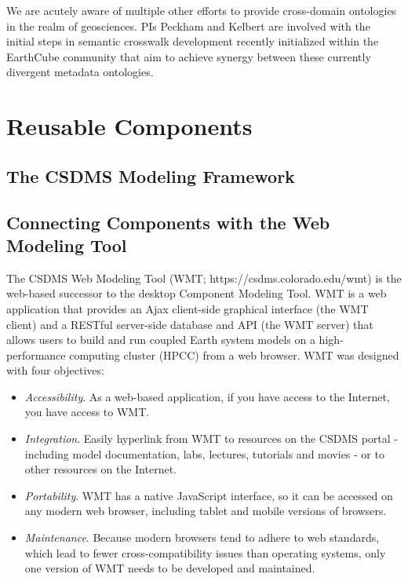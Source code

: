 \documentclass[11pt, oneside]{amsart}
\begin{document}
We are acutely aware of multiple other efforts to provide cross-domain
ontologies in the realm of geosciences. PIs Peckham and Kelbert are involved
with the initial steps in semantic crosswalk development recently initialized
within the EarthCube community that aim to achieve synergy between these
currently divergent metadata ontologies.


\section{Reusable Components}


\subsection{The CSDMS Modeling Framework}


\subsection{Connecting Components with the Web Modeling Tool}

The CSDMS Web Modeling Tool (WMT; https://csdms.colorado.edu/wmt) is the
web-based successor to the desktop Component Modeling Tool. WMT is a web
application that provides an Ajax client-side graphical interface (the WMT
client) and a RESTful server-side database and API (the WMT server) that allows
users to build and run coupled Earth system models on a high-performance
computing cluster (HPCC) from a web browser.
WMT was designed with four objectives:
\begin{itemize}

\item  \emph{Accessibility}. As a web-based application, if you have access
to the Internet, you have access to WMT.

\item  \emph{Integration}. Easily hyperlink from WMT to resources on the CSDMS
portal - including model documentation, labs, lectures, tutorials and
movies - or to other resources on the Internet.

\item \emph{Portability}. WMT has a native JavaScript interface, so it can be
accessed on any modern web browser, including tablet and mobile
versions of browsers.

\item \emph{Maintenance}. Because modern browsers tend to adhere to web
standards, which lead to fewer cross-compatibility issues than
operating systems, only one version of WMT needs to be developed
and maintained.

\end{itemize}
\end{document}
